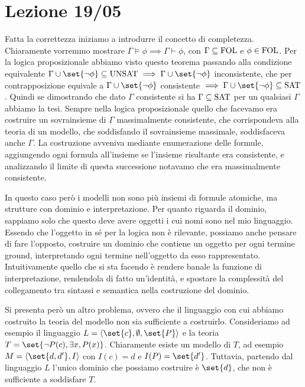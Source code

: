 \chapter{Lezione 19/05}


Fatta la correttezza iniziamo a introdurre il concetto di completezza. Chiaramente vorremmo mostrare \(\Gamma \models \phi \implies \Gamma \vdash \phi\), con \(\Gamma \subseteq \FOL\) e \(\phi \in \FOL\). Per la logica proposizionale abbiamo visto questo teorema passando alla condizione equivalente \(\Gamma \cup \set{\neg \phi} \subseteq \Unsat \implies \Gamma \cup \set{\neg \phi}\) inconsistente, che per contrapposizione equivale a \(\Gamma \cup \set{\neg \phi}\) consistente \(\implies \Gamma \cup \set{\neg \phi} \subseteq \Sat\). Quindi se dimostrando che dato \(\Gamma\) consistente si ha \(\Gamma \subseteq \Sat\) per un qualsiasi \(\Gamma\) abbiamo la tesi. Sempre nella logica proposizionale quello che facevamo era costruire un sovrainsieme di \(\Gamma\) massimalmente consistente, che corrispondeva alla teoria di un modello, che soddisfando il sovrainsieme massimale, soddisfaceva anche \(\Gamma\). La costruzione avveniva mediante enumerazione delle formule, aggiungendo ogni formula all'insieme se l'insieme risultante era consistente, e analizzando il limite di questa successione notavamo che era massimalmente consistente. 

In questo caso però i modelli non sono più insiemi di formule atomiche, ma strutture con dominio e interpretazione. Per quanto riguarda il dominio, sappiamo solo che questo deve avere oggetti i cui nomi sono nel mio linguaggio. Essendo che l'oggetto in sé per la logica non è rilevante, possiamo anche pensare di fare l'opposto, costruire un dominio che contiene un oggetto per ogni termine ground, interpretando ogni termine nell'oggetto da esso rappresentato. Intuitivamente quello che si sta facendo è rendere banale la funzione di interpretazione, rendendola di fatto un'identità, e spostare la complessità del collegamento tra sintassi e semantica nella costruzione del dominio. 

Si presenta però un altro problema, ovvero che il linguaggio con cui abbiamo costruito la teoria del modello non sia sufficiente a costruirlo. Consideriamo ad esempio il linguaggio \(L=\langle \set{c}, \emptyset, \set{P}\rangle\) e la teoria \(T = \set{\neg P(c), \exists x, P(x)}\). Chiaramente esiste un modello di \(T\), ad esempio \(M = \langle \set{d,d'}, I\rangle\) con \(I(c) = d\) e \(I(P) = \set{d'}\). Tuttavia, partendo dal linguaggio \(L\) l'unico dominio che possiamo costruire è \(\set{d}\), che non è sufficiente a soddisfare \(T\).

